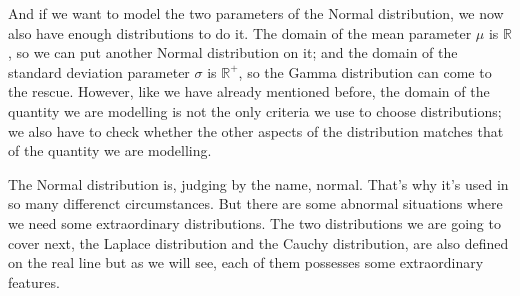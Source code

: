 \documentclass[11pt]{article}
\begin{document}
And if we want to model the two parameters of the Normal distribution, we now also have enough distributions to do it. The domain of the mean parameter \(\mu\) is \(\mathbb{R}\), so we can put another Normal distribution on it; and the domain of the standard deviation parameter \(\sigma\) is \(\mathbb{R}^+\), so the Gamma distribution can come to the rescue. However, like we have already mentioned before, the domain of the quantity we are modelling is not the only criteria we use to choose distributions; we also have to check whether the other aspects of the distribution matches that of the quantity we are modelling.

The Normal distribution is, judging by the name, normal. That's why it's used in so many differenct circumstances. But there are some abnormal situations where we need some extraordinary distributions. The two distributions we are going to cover next, the Laplace distribution and the Cauchy distribution, are also defined on the real line but as we will see, each of them possesses some extraordinary features.
\end{document}
